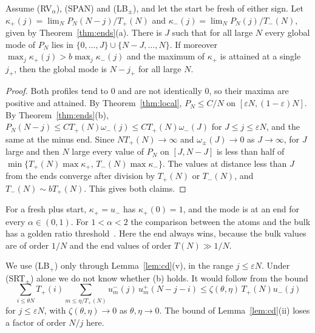 \begin{corollary}\label{cor:mode}
Assume (RV$_\alpha$), (SPAN) and (LB$_\pm$), and let the start be fresh of either sign.
Let $\kappa_\plus(j)=\lim_NP_N(N-j)/T_\plus(N)$ and $\kappa_\minus(j)=\lim_NP_N(j)/T_\minus(N)$,
given by Theorem~\ref{thm:ends}(a). There is $J$ such that for all large $N$ every global
mode of $P_N$ lies in $\{0,\dots,J\}\cup\{N-J,\dots,N\}$. If moreover
$\max_j\kappa_\plus(j)>b\max_j\kappa_\minus(j)$ and the maximum of $\kappa_\plus$ is attained at a
single $j_+$, then the global mode is $N-j_+$ for all large $N$.
\end{corollary}

\begin{proof}
Both profiles tend to $0$ and are not identically $0$, so their maxima are positive and
attained. By Theorem~\ref{thm:local}, $P_N\le C/N$ on $[\varepsilon N,(1-\varepsilon)N]$. By
Theorem~\ref{thm:ends}(b), $P_N(N-j)\le CT_\plus(N)\omega_\minus(j)\le CT_\plus(N)\omega_\minus(J)$
for $J\le j\le\varepsilon N$, and the same at the minus end. Since $NT_\plus(N)\to\infty$ and
$\omega_\pm(J)\to0$ as $J\to\infty$, for $J$ large and then $N$ large every value of $P_N$
on $[J,N-J]$ is less than half of
$\min\{T_\plus(N)\max\kappa_\plus,\,T_\minus(N)\max\kappa_\minus\}$. The values at distance
less than $J$ from the ends converge after division by $T_\plus(N)$ or $T_\minus(N)$, and
$T_\minus(N)\sim bT_\plus(N)$. This gives both claims.
\end{proof}

For a fresh plus start, $\kappa_\plus=u_\minus$ has $\kappa_\plus(0)=1$, and the mode is at
an end for every $\alpha\in(0,1)$. For $1<\alpha<2$ the comparison between the atoms and the
bulk has a golden ratio threshold~\cite{pemmasaniF}. Here the end always wins, because the
bulk values are of order $1/N$ and the end values of order $T(N)\gg1/N$.

\begin{remark}\label{rem:M0}
We use (LB$_\plus$) only through Lemma~\ref{lem:cd}(v), in the range $j\le\varepsilon N$. Under
(SRT$_\pm$) alone we do not know whether (b) holds. It would follow from the bound
\[
 \sum_{i\le\theta N}T_\plus(i)\sum_{m\le\eta/T_\plus(N)}u^\minus_m(j)\,u^\plus_m(N-j-i)\le\zeta(\theta,\eta)\,T_\plus(N)u_\minus(j)
\]
for $j\le\varepsilon N$, with $\zeta(\theta,\eta)\to0$ as $\theta,\eta\to0$. The bound of
Lemma~\ref{lem:cd}(ii) loses a factor of order $N/j$ here.
\end{remark}
